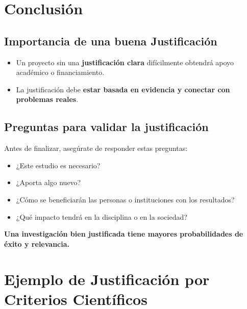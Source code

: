 \documentclass[
  letterpaper,
  DIV=11,
  numbers=noendperiod]{scrartcl}
\providecommand{\tightlist}{%
  \setlength{\itemsep}{0pt}\setlength{\parskip}{0pt}}
\begin{document}
\section{\texorpdfstring{\textbf{Conclusión}}{Conclusión}}\label{conclusiuxf3n-1}

\subsection{\texorpdfstring{\textbf{Importancia de una buena
Justificación}}{Importancia de una buena Justificación}}\label{importancia-de-una-buena-justificaciuxf3n}

\begin{itemize}
\tightlist
\item
  Un proyecto sin una \textbf{justificación clara} difícilmente obtendrá
  apoyo académico o financiamiento.\\
\item
  La justificación debe \textbf{estar basada en evidencia y conectar con
  problemas reales}.
\end{itemize}

\subsection{\texorpdfstring{\textbf{Preguntas para validar la
justificación}}{Preguntas para validar la justificación}}\label{preguntas-para-validar-la-justificaciuxf3n}

Antes de finalizar, asegúrate de responder estas preguntas:

\begin{itemize}
\tightlist
\item
  ¿Este estudio es necesario?\\
\item
  ¿Aporta algo nuevo?\\
\item
  ¿Cómo se beneficiarán las personas o instituciones con los
  resultados?\\
\item
  ¿Qué impacto tendrá en la disciplina o en la sociedad?
\end{itemize}

\textbf{Una investigación bien justificada tiene mayores probabilidades
de éxito y relevancia.}

\section{Ejemplo de Justificación por Criterios
Científicos}\label{ejemplo-de-justificaciuxf3n-por-criterios-cientuxedficos}
\end{document}
